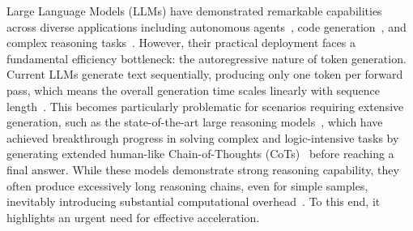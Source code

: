 \documentclass{article} %
\begin{document}
Large Language Models (LLMs) have demonstrated remarkable capabilities~\citep{deepseek-ai2025deepseekr1,yang2025qwen3,glm-4.5team2025glm45,kimiteam2025kimi} across diverse applications including autonomous agents~\citep{wangSurveyLargeLanguage2024,guoLargeLanguageModel2024}, code generation~\citep{liuLargeLanguageModelBased2024,jiangSurveyLargeLanguage2024}, and complex reasoning tasks~\citep{chenReasoningEraSurvey2025, ahnLargeLanguageModels2024}. However, their practical deployment faces a fundamental efficiency bottleneck: the autoregressive nature of token generation. Current LLMs generate text sequentially, producing only one token per forward pass, which means the overall generation time scales linearly with sequence length~\citep{santilli2023accelerating}. This becomes particularly problematic for scenarios requiring extensive generation, such as the state-of-the-art large reasoning models~\citep{openai2024openai,deepseek-ai2025deepseekr1}, which have achieved breakthrough progress in solving complex and logic-intensive tasks by generating extended human-like Chain-of-Thoughts (CoTs)~\citep{wei2022chainofthought,sprague2025cot} before reaching a final answer. While these models demonstrate strong reasoning capability, they often produce excessively long reasoning chains, even for simple samples, inevitably introducing substantial computational overhead~\citep{feng2025efficient}. To this end, it highlights an urgent need for effective acceleration. 

\end{document}
